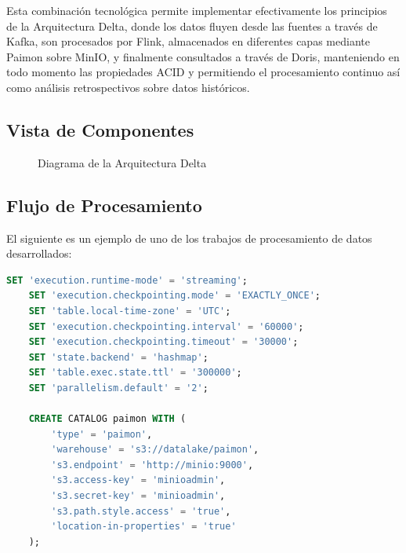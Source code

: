 Esta combinación tecnológica permite implementar efectivamente los principios de la Arquitectura Delta, 
donde los datos fluyen desde las fuentes a través de Kafka, son procesados por Flink, 
almacenados en diferentes capas mediante Paimon sobre MinIO, y finalmente consultados a través de Doris, 
manteniendo en todo momento las propiedades ACID 
y permitiendo el procesamiento continuo así como análisis retrospectivos sobre datos históricos.

\newpage
\subsection{Vista de Componentes}


\begin{figure}[h]
    \caption{Diagrama de la Arquitectura Delta}
    \label{fig:des_arquitectura_delta}
\end{figure}

\clearpage
\newpage

\subsection{Flujo de Procesamiento}

El siguiente es un ejemplo de uno de los trabajos de procesamiento de datos desarrollados:

\begin{lstlisting}[language=sql]
    SET 'execution.runtime-mode' = 'streaming';
    SET 'execution.checkpointing.mode' = 'EXACTLY_ONCE';
    SET 'table.local-time-zone' = 'UTC';
    SET 'execution.checkpointing.interval' = '60000';
    SET 'execution.checkpointing.timeout' = '30000';
    SET 'state.backend' = 'hashmap';
    SET 'table.exec.state.ttl' = '300000';
    SET 'parallelism.default' = '2';

    CREATE CATALOG paimon WITH (
        'type' = 'paimon',
        'warehouse' = 's3://datalake/paimon',
        's3.endpoint' = 'http://minio:9000',
        's3.access-key' = 'minioadmin',  
        's3.secret-key' = 'minioadmin',
        's3.path.style.access' = 'true',
        'location-in-properties' = 'true'
    );
\end{lstlisting}


